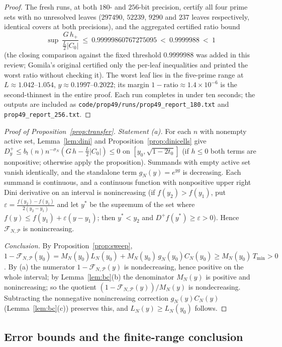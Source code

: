 \documentclass[11pt]{article}
\theoremstyle{definition}
\newcommand{\eps}{\varepsilon}
\newcommand{\calP}{\mathcal{P}}
\begin{document}
\begin{proof}
The fresh runs, at both $180$- and $256$-bit precision, certify
all four prime sets with no unresolved leaves ($297490$, $52239$,
$9290$ and $237$ leaves respectively, identical covers at both
precisions), and the aggregated certified ratio bound
\[
\sup\ \frac{G\,h_+}{\frac L2|C_0|}\ \le\ 0.99999860767275095
\ <\ 0.9999988\ <\ 1
\]
(the closing comparison against the fixed threshold $0.9999988$
was added in this review; Gomila's original certified only the
per-leaf inequalities and printed the worst ratio without checking
it). The worst leaf lies in the five-prime range at
$L\approx1.042$--$1.054$, $y\approx0.1997$--$0.2022$; its margin
$1-\text{ratio}\approx1.4\times10^{-6}$ is the second-thinnest in
the entire proof. Each run completes in under ten seconds; the
outputs are included as
\texttt{code/prop49/runs/prop49\_report\_180.txt}
and \texttt{prop49\_report\_256.txt}.
\end{proof}

\begin{proof}[Proof of Proposition~\ref{prop:transfer}]
\emph{Statement (a).} For each $n$ with nonempty active set,
Lemma~\ref{lem:dini} and Proposition~\ref{prop:dinicells} give
$D^+_y\le b_t(n)n^{-\sigma_N}(G\,h-\frac L2|C_0|)\le0$ on
$[y_0,\sqrt{1-2t_0}]$ (if $h\le0$ both terms are nonpositive;
otherwise apply the proposition). Summands with empty active set
vanish identically, and the standalone term $g_N(y)=e^{yg}$ is
decreasing. Each summand is continuous, and a continuous function
with nonpositive upper right Dini derivative on an interval is
nonincreasing (if $f(y_2)>f(y_1)$, put
$\eps=\frac{f(y_2)-f(y_1)}{2(y_2-y_1)}$ and let $y^*$ be the
supremum of the set where $f(y)\le f(y_1)+\eps(y-y_1)$; then
$y^*<y_2$ and $D^+f(y^*)\ge\eps>0$). Hence
$\mathcal F_{N,\calP}$ is nonincreasing.

\emph{Conclusion.} By Proposition~\ref{prop:sweep},
$1-\mathcal F_{N,\calP}(y_0)=M_N(y_0)L_N(y_0)+M_N(y_0)\,
g_N(y_0)C_N(y_0)\ge M_N(y_0)\,T_{\min}>0$. By (a) the numerator
$1-\mathcal F_{N,\calP}(y)$ is nondecreasing, hence positive on the
whole interval; by Lemma~\ref{lem:bc}(b) the denominator $M_N(y)$
is positive and nonincreasing; so the quotient
$(1-\mathcal F_{N,\calP}(y))/M_N(y)$ is nondecreasing. Subtracting
the nonnegative nonincreasing correction $g_N(y)C_N(y)$
(Lemma~\ref{lem:bc}(c)) preserves this, and
$L_N(y)\ge L_N(y_0)$ follows.
\end{proof}

\subsection{Error bounds and the finite-range conclusion}
\label{sec:finiteerr}
\end{document}
